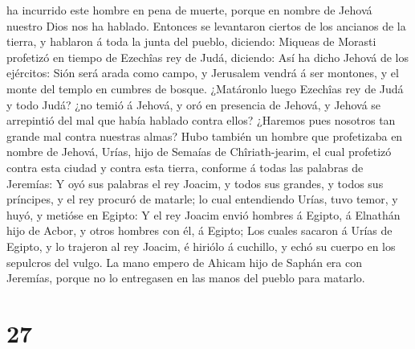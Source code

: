 ha incurrido este hombre en pena de muerte, porque en nombre de Jehová
nuestro Dios nos ha hablado.  Entonces se levantaron
ciertos de los ancianos de la tierra, y hablaron á toda la junta del
pueblo, diciendo:  Miqueas de Morasti profetizó en tiempo
de Ezechîas rey de Judá, diciendo: Así ha dicho Jehová de los ejércitos:
Sión será arada como campo, y Jerusalem vendrá á ser montones, y el
monte del templo en cumbres de bosque.  ¿Matáronlo luego
Ezechîas rey de Judá y todo Judá? ¿no temió á Jehová, y oró en presencia
de Jehová, y Jehová se arrepintió del mal que había hablado contra
ellos? ¿Haremos pues nosotros tan grande mal contra nuestras almas?
 Hubo también un hombre que profetizaba en nombre de
Jehová, Urías, hijo de Semaías de Chîriath-jearim, el cual profetizó
contra esta ciudad y contra esta tierra, conforme á todas las palabras
de Jeremías:  Y oyó sus palabras el rey Joacim, y todos sus
grandes, y todos sus príncipes, y el rey procuró de matarle; lo cual
entendiendo Urías, tuvo temor, y huyó, y metióse en Egipto:
 Y el rey Joacim envió hombres á Egipto, á Elnathán hijo de
Acbor, y otros hombres con él, á Egipto;  Los cuales
sacaron á Urías de Egipto, y lo trajeron al rey Joacim, é hiriólo á
cuchillo, y echó su cuerpo en los sepulcros del vulgo.  La
mano empero de Ahicam hijo de Saphán era con Jeremías, porque no lo
entregasen en las manos del pueblo para matarlo.

\hypertarget{section-26}{%
\section{27}\label{section-26}}

